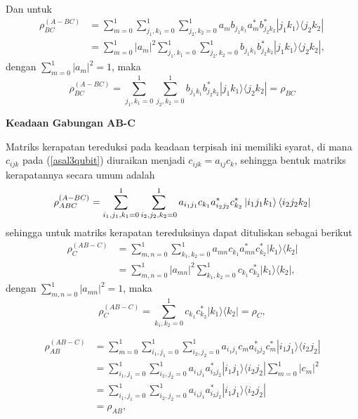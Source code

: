 Dan untuk
\begin{align*}
	\rho_{BC}^{(A-BC)} 
	&= \sum_{m=0}^{1} \sum_{j_1,k_1=0}^{1}\sum_{j_2,k_2=0}^{1}a_m b_{j_1k_1}a^{*}_m b^{*}_{j_2k_2}|j_1 k_1\rangle \langle j_2 k_2| \\
	&= \sum_{m=0}^{1} |a_m|^2 \sum_{j_1,k_1=0}^{1}\sum_{j_2,k_2=0}^{1} b_{j_1k_1} b^{*}_{j_2k_2}|j_1 k_1\rangle \langle j_2 k_2|,
\end{align*}
dengan $\sum_{m=0}^{1}|a_m|^2=1$, maka
\begin{equation}
	\rho_{BC}^{(A-BC)} = \sum_{j_1,k_1=0}^{1}\sum_{j_2,k_2=0}^{1} b_{j_1k_1} b^{*}_{j_2k_2}|j_1 k_1\rangle \langle j_2 k_2|=\rho_{BC}
\end{equation}

\textbf{Keadaan Gabungan AB-C}

Matriks kerapatan tereduksi pada keadaan terpisah ini memiliki syarat, di mana $c_{ijk}$ pada (\ref{asal3qubit}) diuraikan menjadi $c_{ijk}=a_{ij} c_k$, sehingga bentuk matriks kerapatannya secara umum adalah
\begin{equation}
	\rho_{ABC}^{(A-BC)}=\sum_{i_1,j_1,k_1=0}^1\sum_{i_2,j_2,k_2=0}^1 a_{i_1j_1} c_{k_1} a^{*}_{i_2j_2} c^{*}_{k_2}\ket{i_1j_1k_1}\bra{i_2j_2k_2}
\end{equation}
sehingga untuk matriks kerapatan tereduksinya dapat dituliskan sebagai berikut
\begin{align*}
	\rho_{C}^{(AB-C)} 
	&= \sum_{m,n=0}^{1}\sum_{k_1,k_2=0}^{1}a_{mn} c_{k_1}a^{*}_{mn} c^{*}_{k_2}|k_1\rangle \langle k_2|\\
	&=\sum_{m,n=0}^{1}|a_{mn}|^2\sum_{k_1,k_2=0}^{1} c_{k_1} c^{*}_{k_2}|k_1\rangle \langle k_2|,
\end{align*}
dengan $\sum_{m,n=0}^{1}|a_{mn}|^2=1$, maka
\begin{equation}
	\rho_{C}^{(AB-C)} = \sum_{k_1,k_2=0}^{1} c_{k_1} c^{*}_{k_2}|k_1\rangle \langle k_2|=\rho_C,
\end{equation}

\begin{equation}
	\begin{aligned}
		\rho_{AB}^{(AB-C)} 
		&= \sum_{m=0}^{1} \sum_{i_1,j_1=0}^{1}\sum_{i_2,j_2=0}^{1} a_{i_1j_1}c_m a^{*}_{i_2j_2}c^{*}_m |i_1 j_1\rangle \langle i_2 j_2| \\
		&= \sum_{i_1,j_1=0}^{1}\sum_{i_2,j_2=0}^{1} a_{i_1j_1} a^{*}_{i_2j_2} |i_1 j_1\rangle \langle i_2 j_2| \sum_{m=0}^{1}|c_{m}|^2 \\
		&= \sum_{i_1,j_1=0}^{1}\sum_{i_2,j_2=0}^{1} a_{i_1j_1} a^{*}_{i_2j_2} |i_1 j_1\rangle \langle i_2 j_2| \\
		&=\rho_{AB},
	\end{aligned}
\end{equation}

